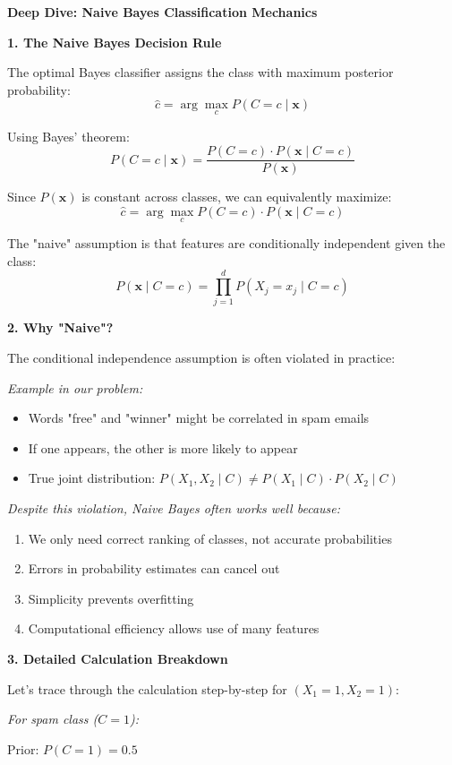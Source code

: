 \documentclass[12pt]{article}
\begin{document}
\begin{explanation}
\textbf{Deep Dive: Naive Bayes Classification Mechanics}

\textbf{1. The Naive Bayes Decision Rule}

The optimal Bayes classifier assigns the class with maximum posterior probability:
\[
\hat{c} = \arg\max_{c} P(C = c \mid \mathbf{x})
\]

Using Bayes' theorem:
\[
P(C = c \mid \mathbf{x}) = \frac{P(C = c) \cdot P(\mathbf{x} \mid C = c)}{P(\mathbf{x})}
\]

Since $P(\mathbf{x})$ is constant across classes, we can equivalently maximize:
\[
\hat{c} = \arg\max_{c} P(C = c) \cdot P(\mathbf{x} \mid C = c)
\]

The "naive" assumption is that features are conditionally independent given the class:
\[
P(\mathbf{x} \mid C = c) = \prod_{j=1}^{d} P(X_j = x_j \mid C = c)
\]

\textbf{2. Why "Naive"?}

The conditional independence assumption is often violated in practice:

\textit{Example in our problem:}
\begin{itemize}
    \item Words "free" and "winner" might be correlated in spam emails
    \item If one appears, the other is more likely to appear
    \item True joint distribution: $P(X_1, X_2 \mid C) \neq P(X_1 \mid C) \cdot P(X_2 \mid C)$
\end{itemize}

\textit{Despite this violation, Naive Bayes often works well because:}
\begin{enumerate}
    \item We only need correct ranking of classes, not accurate probabilities
    \item Errors in probability estimates can cancel out
    \item Simplicity prevents overfitting
    \item Computational efficiency allows use of many features
\end{enumerate}

\textbf{3. Detailed Calculation Breakdown}

Let's trace through the calculation step-by-step for $(X_1 = 1, X_2 = 1)$:

\textit{For spam class ($C = 1$):}

Prior: $P(C = 1) = 0.5$


\end{explanation}
\end{document}
